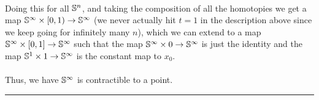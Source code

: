\documentclass[11pt]{article}
\begin{document}
\\
Doing this for all $\mathbb{S}^{n}$, and taking the composition of all the homotopies we get a  map $\mathbb{S}^{\infty} \times [0, 1) \rightarrow \mathbb{S}^{\infty}$ (we never actually hit $t = 1$ in the description above since we keep going for infinitely many $n$), which we can extend to a map $\mathbb{S}^{\infty} \times [0, 1] \rightarrow \mathbb{S}^{\infty}$ such that the map $\mathbb{S}^{\infty} \times 0 \rightarrow \mathbb{S}^{\infty}$ is just the identity and the map $\mathbb{S}^{1} \times 1 \rightarrow \mathbb{S}^{\infty}$ is the constant map to $x_0$.
\\
\\
Thus, we have $\mathbb{S}^{\infty}$ is contractible to a point.
\vskip 0.5cm
\hrule
\pagebreak












% 
\end{document}
